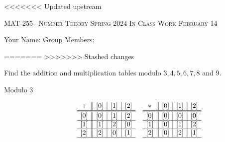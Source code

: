 \documentclass[handout]{ximera}
\date{February 14, 2024}
\date{\classday, 2024}
\begin{document}
\handoutAbstract
\maketitle
<<<<<<< Updated upstream
  \begin{center}%
    {\large \scshape MAT-255-- Number Theory \hfill Spring 2024 \hfill In Class Work February 14}%
    
    {\large
        Your Name: \hrulefill \quad Group Members:\hrulefill \quad \hrulefill
	\par}%
  \end{center}%
=======
>>>>>>> Stashed changes


\begin{br}
    Find the addition and multiplication tables modulo $3,4,5,6,7,8$ and $9.$ 
    
    \begin{solution}
        \begin{description}
            \item[Modulo $3$] 
                \begin{align*}
                & \begin{array}{c||c|c|c}
                    + & [0] & [1] & [2]\\ \hline\hline
                    [0] & [0] & [1] & [2] \\ \hline
                    [1] & [1] & [2] & [0] \\ \hline
                    [2]  & [2] & [0]& [1]\\ \hline
                \end{array}
                & \begin{array}{c||c|c|c}
                    \ast & [0] & [1] & [2]\\ \hline\hline
                    [0] & [0] & [0] & [0] \\ \hline
                    [1] & [0] & [1] & [2] \\ \hline
                    [2] & [0] & [2]& [1]\\ \hline
                \end{array}
                \end{align*}
        

\end{description}
\end{solution}
\end{br}
\end{document}
